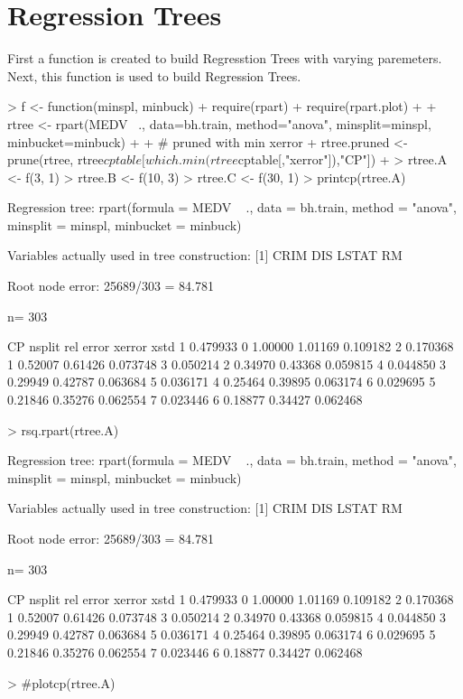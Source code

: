 \documentclass{article}
\begin{document}
\section*{Regression Trees}

First a function is created to build Regresstion Trees with varying paremeters. Next, this function is used to build Regression Trees.

\begin{Schunk}
\begin{Sinput}
> f <- function(minspl, minbuck) {
+   require(rpart)
+   require(rpart.plot)
+   
+   rtree <- rpart(MEDV ~., data=bh.train, method="anova", minsplit=minspl, minbucket=minbuck)
+   
+   # pruned with min xerror
+   rtree.pruned <- prune(rtree, rtree$cptable[which.min(rtree$cptable[,"xerror"]),"CP"])  
+ }
> rtree.A <- f(3, 1)
> rtree.B <- f(10, 3)
> rtree.C <- f(30, 1)
> printcp(rtree.A)
\end{Sinput}
\begin{Soutput}
Regression tree:
rpart(formula = MEDV ~ ., data = bh.train, method = "anova", 
    minsplit = minspl, minbucket = minbuck)

Variables actually used in tree construction:
[1] CRIM  DIS   LSTAT RM   

Root node error: 25689/303 = 84.781

n= 303 

        CP nsplit rel error  xerror     xstd
1 0.479933      0   1.00000 1.01169 0.109182
2 0.170368      1   0.52007 0.61426 0.073748
3 0.050214      2   0.34970 0.43368 0.059815
4 0.044850      3   0.29949 0.42787 0.063684
5 0.036171      4   0.25464 0.39895 0.063174
6 0.029695      5   0.21846 0.35276 0.062554
7 0.023446      6   0.18877 0.34427 0.062468
\end{Soutput}
\begin{Sinput}
> rsq.rpart(rtree.A)
\end{Sinput}
\begin{Soutput}
Regression tree:
rpart(formula = MEDV ~ ., data = bh.train, method = "anova", 
    minsplit = minspl, minbucket = minbuck)

Variables actually used in tree construction:
[1] CRIM  DIS   LSTAT RM   

Root node error: 25689/303 = 84.781

n= 303 

        CP nsplit rel error  xerror     xstd
1 0.479933      0   1.00000 1.01169 0.109182
2 0.170368      1   0.52007 0.61426 0.073748
3 0.050214      2   0.34970 0.43368 0.059815
4 0.044850      3   0.29949 0.42787 0.063684
5 0.036171      4   0.25464 0.39895 0.063174
6 0.029695      5   0.21846 0.35276 0.062554
7 0.023446      6   0.18877 0.34427 0.062468
\end{Soutput}
\begin{Sinput}
> #plotcp(rtree.A)
\end{Sinput}
\end{Schunk}
\end{document}
